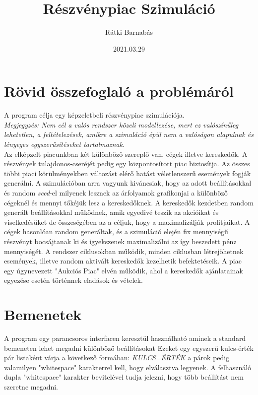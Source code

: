 \documentclass{article}[12pt,a4paper]
\title{Részvénypiac Szimuláció}
\author{Rátki Barnabás}
\date{2021.03.29}
\begin{document}
    \maketitle


    \section{Rövid összefoglaló a problémáról}\label{sec:description}
    A program célja egy képzeletbeli részvénypiac szimulációja. \\
    \textit{Megjegyzés: Nem cél a valós rendszer közeli modellezése, mert ez valószínűleg lehetetlen, a feltételezések, amikre a szimuláció épül nem a valóságon alapulnak és lényeges egyszerűsítéseket tartalmaznak.}\\
    Az elképzelt piacunkban két különböző szereplő van, cégek illetve kereskedők.
    A részvények tulajdonos-cseréjét pedig egy központosított piac biztosítja.
    Az összes többi piaci körülményekben változást elérő hatást véletlenszerű események fogják generálni.
    A szimulációban arra vagyunk kiváncsiak, hogy az adott beállításokkal és random \textit{seed}-el milyenek lesznek az árfolyamok grafikonjai a különböző cégeknél és mennyi tőkéjük lesz a kereskedőknek.
    A kereskedők kezdetben random generált beállításokkal működnek, amik egyedivé teszik az akcióikat és viselkedésüket de összeségében az a céljuk, hogy a maximalizálják profitjaikat.
    A cégek hasonlóan random generáltak, és a szimuláció elején fix mennyiségű részvényt bocsájtanak ki és igyekszenek maximalizálni az így beszedett pénz mennyiségét.
    A rendszer ciklusokban működik, minden ciklusban létrejöhetnek események, illetve random aktivált kereskedők kezelhetik befektetéseik.
    A piac egy úgynevezett "Aukciós Piac" elvén működik, ahol a kereskedők ajánlatainak egyezése esetén történnek eladások és vételek.


    \section{Bemenetek}
    A program egy parancsoros interfacen keresztül használható aminek a standard bemeneten lehet megadni különböző beállításokat
    Ezeket egy egyszerű kulcs-érték pár listaként várja a következő formában:
    \textit{KULCS=ÉRTÉK} a párok pedig valamilyen "whitespace" karakterrel kell, hogy elválasztva legyenek.
    A felhasználó dupla "whitespace" karakter bevitelével tudja jelezni, hogy több beállítást nem szeretne megadni.
\end{document}
